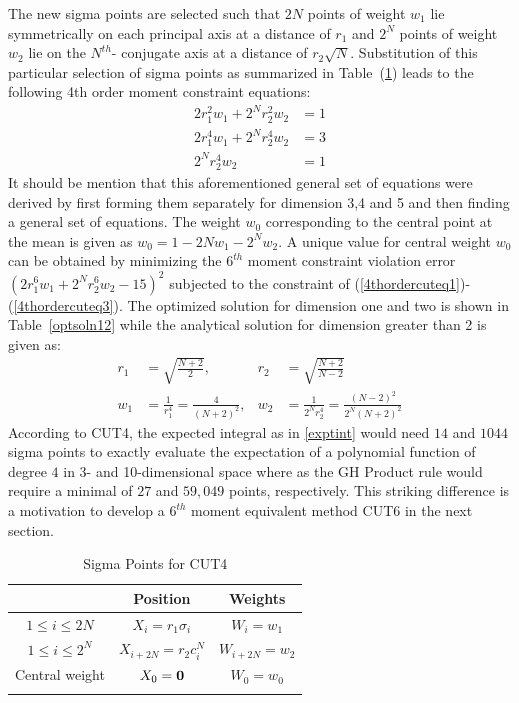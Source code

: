 \documentclass[letterpaper, 10 pt, conference]{IEEEtran}  %
\begin{document}
The new sigma points are selected such that $2N$ points of weight $w_1$ lie symmetrically on each principal axis at a distance of $r_1$ and $2^N$ points of weight $w_2$ lie on the $N^{th}$- conjugate axis at a distance of $r_2\sqrt{N}$. Substitution of this particular selection of sigma points as summarized in Table~(\ref{sigpointscut4}) leads to the following 4th order moment constraint equations: 
\begin{align}
2r_1^2w_1+2^Nr_2^2w_2&=1 \label{4thordercuteq1}\\
2r_1^4w_1+2^Nr_2^4w_2&=3\\
2^Nr_2^4w_2&=1\label{4thordercuteq3}
\end{align}
It should be mention that this aforementioned general set of equations were derived by first forming them separately for dimension 3,4 and 5 and then finding a general set of equations. The weight $w_0$ corresponding to the central point at the mean is given as $w_0=1-2Nw_1-2^Nw_2$.
A unique value for central weight $w_0$ can be obtained by minimizing the  $6^{th}$ moment constraint violation error $(2r_1^6w_1+2^Nr_2^6w_2-15)^2$ subjected to the constraint of (\ref{4thordercuteq1})-(\ref{4thordercuteq3}). The optimized solution for dimension one and two is shown in Table~\ref{optsoln12} while the analytical solution for dimension greater than 2 is given as: 
\begin{align}
r_1&=\sqrt{\frac{N+2}{2}}, &r_2&=\sqrt{\frac{N+2}{N-2}}\\
w_1&=\frac{1}{r_1^4}=\frac{4}{(N+2)^2} ,&w_2&=\frac{1}{2^Nr_2^4}=\frac{(N-2)^2}{2^N(N+2)^2}
\end{align}
According to CUT4, the expected integral as in \eqref{exptint} would need  $14$ and $1044$ sigma points to exactly evaluate the expectation of a polynomial function of degree $4$ in 3- and 10-dimensional space where as the GH Product rule would require a minimal of $27$ and $59,049$ points, respectively. This striking difference is a motivation to develop a $6^{th}$ moment equivalent method CUT6 in the next section.
\begin{table}
\caption{Sigma Points for CUT4 }\vspace{-0.1in}

\small
\label{sigpointscut4}
\begin{center}
\begin{tabular}{c|c|c}
&Position & Weights\\
\hline
\hline
$1\le i\le 2N$ & $X_i=r_1\sigma_i$ & $W_i=w_1$\\
\hline\noalign{\smallskip}
$1 \le i \le 2^N$ & $X_{i+2N}=r_2c^N_i$ & $W_{i+2N}=w_2$\\
\hline\noalign{\smallskip}
Central weight & $X_{0}={\bf 0}$ & $W_{0}=w_0$\\
\hline\noalign{\smallskip}
\multicolumn{3}{c}{$n=2N+2^N$$\:(+1)$} \\
\hline
\end{tabular}
\end{center}\vspace{-0.2in}
\end{table}
\end{document}

